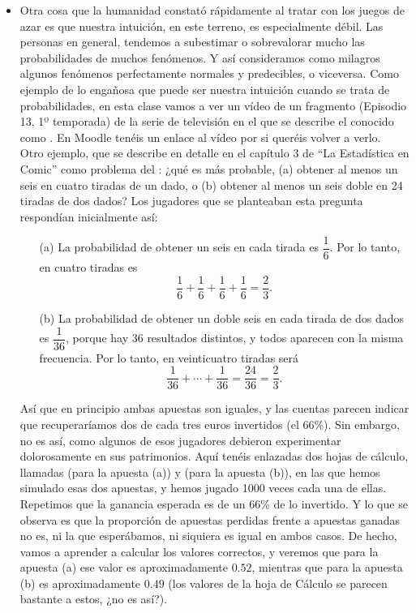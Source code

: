 \begin{itemize}
    \item Otra cosa que la humanidad constató rápidamente al tratar con los juegos de azar es que nuestra intuición, en este terreno, es especialmente débil. Las personas en general, tendemos a subestimar o sobrevalorar mucho las probabilidades de muchos fenómenos. Y así consideramos como milagros algunos fenómenos perfectamente normales y predecibles, o viceversa. Como ejemplo de lo engañosa que puede ser nuestra intuición cuando se trata de probabilidades, en esta clase vamos a ver un vídeo de un fragmento (Episodio 13, 1º temporada) de la serie de televisión  en el que se describe el conocido como . En Moodle tenéis un enlace al vídeo por si queréis volver a verlo.\\[3mm]
        Otro ejemplo, que se describe en detalle en el capítulo 3 de ``La Estadística en Comic'' como problema del : ¿qué es más probable, (a) obtener al menos un seis en cuatro tiradas de un dado, o (b) obtener al menos un seis doble en 24 tiradas de dos dados? Los jugadores que se planteaban esta pregunta respondían inicialmente así:
        \begin{itemize}
            \item[(a)] La probabilidad de obtener un seis en cada tirada es $\dfrac{1}{6}$. Por lo tanto, en cuatro tiradas es \[\dfrac{1}{6}+\dfrac{1}{6}+\dfrac{1}{6}+\dfrac{1}{6}=\dfrac{2}{3}.\]
            \item[(b)] La probabilidad de obtener un doble seis en cada tirada de dos dados es $\dfrac{1}{36}$, porque hay 36 resultados distintos, y todos aparecen con la misma frecuencia. Por lo tanto, en veinticuatro tiradas será \[\dfrac{1}{36}+\cdots+\dfrac{1}{36}=\dfrac{24}{36}=\dfrac{2}{3}.\]
        \end{itemize}
        Así que en principio ambas apuestas son iguales, y las cuentas parecen indicar que recuperaríamos dos de cada tres euros invertidos (el 66\%). Sin embargo, no es así, como algunos de esos jugadores debieron experimentar dolorosamente en sus patrimonios. Aquí tenéis enlazadas dos hojas de cálculo, llamadas  (para la apuesta (a)) y  (para la apuesta (b)), en las que hemos simulado esas dos apuestas, y hemos jugado 1000 veces cada una de ellas. Repetimos que la ganancia esperada es de un 66\% de lo invertido. Y lo que se observa es que la proporción de apuestas perdidas frente a apuestas ganadas no es, ni la que esperábamos, ni siquiera es igual en ambos casos. De hecho, vamos a aprender a calcular los valores correctos, y veremos que para la apuesta (a) ese valor es aproximadamente $0.52$, mientras que para la apuesta (b) es aproximadamente $0.49$ (los valores de la hoja de Cálculo se
parecen bastante a estos, ¿no es así?).

\end{itemize}

